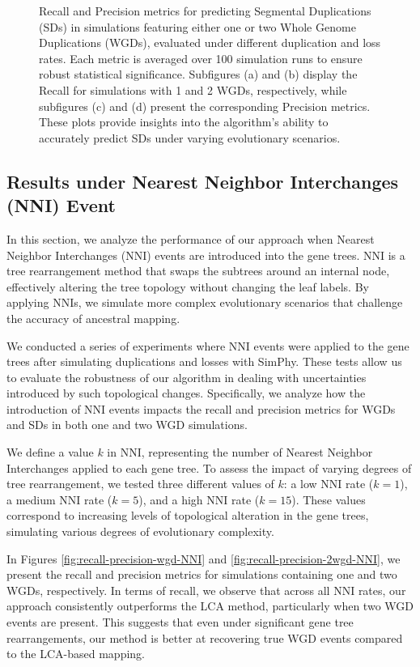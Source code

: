 \documentclass[10pt]{article}
\begin{document}
\begin{figure}[h!]
    \caption{
        Recall and Precision metrics for predicting Segmental Duplications (SDs) in simulations featuring either one or two Whole Genome Duplications (WGDs), evaluated under different duplication and loss rates. Each metric is averaged over 100 simulation runs to ensure robust statistical significance. Subfigures (a) and (b) display the Recall for simulations with 1 and 2 WGDs, respectively, while subfigures (c) and (d) present the corresponding Precision metrics. These plots provide insights into the algorithm's ability to accurately predict SDs under varying evolutionary scenarios.
    }
    \label{fig:recall-precision-sd}
\end{figure}


\subsection{Results under Nearest Neighbor Interchanges (NNI) Event}

In this section, we analyze the performance of our approach when Nearest Neighbor Interchanges (NNI) events are introduced into the gene trees. NNI is a tree rearrangement method that swaps the subtrees around an internal node, effectively altering the tree topology without changing the leaf labels. By applying NNIs, we simulate more complex evolutionary scenarios that challenge the accuracy of ancestral mapping.

We conducted a series of experiments where NNI events were applied to the gene trees after simulating duplications and losses with SimPhy. These tests allow us to evaluate the robustness of our algorithm in dealing with uncertainties introduced by such topological changes. Specifically, we analyze how the introduction of NNI events impacts the recall and precision metrics for WGDs and SDs in both one and two WGD simulations.

We define a value $k$ in NNI, representing the number of Nearest Neighbor Interchanges applied to each gene tree. To assess the impact of varying degrees of tree rearrangement, we tested three different values of $k$: a low NNI rate ($k=1$), a medium NNI rate ($k=5$), and a high NNI rate ($k=15$). These values correspond to increasing levels of topological alteration in the gene trees, simulating various degrees of evolutionary complexity.

In Figures \ref{fig:recall-precision-wgd-NNI} and \ref{fig:recall-precision-2wgd-NNI}, we present the recall and precision metrics for simulations containing one and two WGDs, respectively. In terms of recall, we observe that across all NNI rates, our approach consistently outperforms the LCA method, particularly when two WGD events are present. This suggests that even under significant gene tree rearrangements, our method is better at recovering true WGD events compared to the LCA-based mapping.
\end{document}
